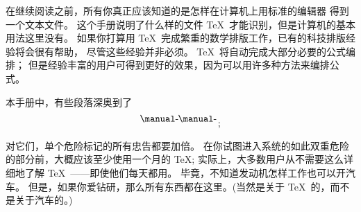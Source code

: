 {%
在继续阅读之前，所有你真正应该知道的是怎样在计算机上用标准的编辑器%
得到一个文本文件。%
这个手册说明了什么样的文件 \TeX\ 才能识别，但是计算机的基本用法这里没有。%
如果你打算用 \TeX\ 完成繁重的数学排版工作，已有的科技排版经验将会很有帮助，
尽管这些经验并非必须。
\TeX\ 将自动完成大部分必要的公式编排；%
但是经验丰富的用户可得到更好的效果，因为可以用许多种方法来编排公式。

本手册中，有些段落深奥到了
$$\vcenter{\hbox{\dbend\kern1pt\dbend}\vskip 11pt}\;;$$
对它们，单个危险标记的所有忠告都要加倍。%
在你试图进入系统的如此双重危险的部分前，大概应该至少使用一个月的 \TeX; %
实际上，大多数用户从不需要这么详细地了解 \TeX\ ——即使他们每天都用。%
毕竟，不知道发动机怎样工作也可以开汽车。%
但是，如果你爱钻研，那么所有东西都在这里。(当然是关于 \TeX\ 的，而不是关于汽车的。)

}

